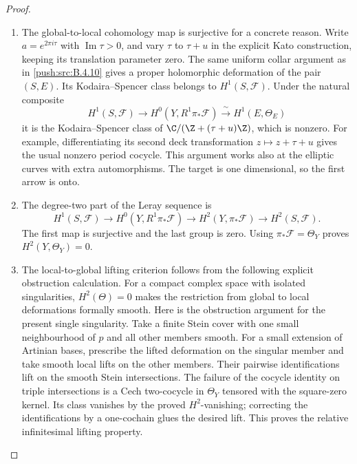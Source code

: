 \begin{proof}
\begin{enumerate}[label=\arabic*.,leftmargin=*]
\item The global-to-local cohomology map is surjective for a concrete
reason.  Write $a=e^{2\pi i\tau}$ with $\operatorname{Im}\tau>0$,
and vary $\tau$ to $\tau+u$ in the explicit Kato construction,
keeping its translation parameter zero.
The same uniform collar argument as in \ref{push:src:B.4.10} gives a proper
holomorphic deformation of the pair $(S,E)$.
Its Kodaira--Spencer class belongs to $H^1(S,\mathcal F)$.
Under the natural composite
\[
 H^1(S,\mathcal F)\longrightarrow
 H^0(Y,R^1\pi_*\mathcal F)
 \xrightarrow{\ \sim\ }H^1(E,\Theta_E)
\]
it is the Kodaira--Spencer class of
$\C/(\Z+(\tau+u)\Z)$, which is nonzero.
For example, differentiating its second deck transformation
$z\mapsto z+\tau+u$ gives the usual nonzero period cocycle.
This argument works also at the elliptic curves with extra
automorphisms.
The target is one dimensional, so the first arrow is onto.

\item The degree-two part of the Leray sequence is
\[
 H^1(S,\mathcal F)\longrightarrow
 H^0(Y,R^1\pi_*\mathcal F)\longrightarrow
 H^2(Y,\pi_*\mathcal F)\longrightarrow H^2(S,\mathcal F).
\]
The first map is surjective and the last group is zero.
Using $\pi_*\mathcal F=\Theta_Y$ proves
$H^2(Y,\Theta_Y)=0$.

\item The local-to-global lifting criterion follows from the
following explicit obstruction calculation.
For a compact complex space with isolated singularities,
$H^2(\Theta)=0$ makes the restriction from global to local
deformations formally smooth.
Here is the obstruction argument for the present single
singularity.  Take a finite Stein cover with one small
neighbourhood of $p$ and all other members smooth.
For a small extension of Artinian bases, prescribe the lifted
deformation on the singular member and take smooth local
lifts on the other members.  Their pairwise identifications
lift on the smooth Stein intersections.  The failure of the
cocycle identity on triple intersections is a Cech two-cocycle
in $\Theta_Y$ tensored with the square-zero kernel.
Its class vanishes by the proved $H^2$-vanishing; correcting
the identifications by a one-cochain glues the desired lift.
This proves the relative infinitesimal lifting property.


\end{enumerate}
\end{proof}
